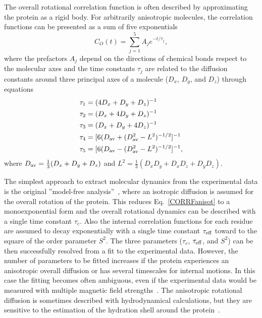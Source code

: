 \documentclass[journal=jpcbfk,manuscript=article]{achemso}
\begin{document}
The overall rotational correlation function is often described
by approximating the protein as a rigid body.
For arbitrarily anisotropic molecules, the correlation functions
can  be presented as a sum of five exponentials~\cite{woessner62,korzhnev01}
\begin{equation}\label{CORRFanisot}
  C_O(t)=\sum_{j=1}^5 A_j e^{-t/\tau_j},
\end{equation}
where the prefactors $A_j$ depend on the directions of chemical bonds 
respect to the molecular axes \cite{woessner62,luginbuhl97} and
the time constants $\tau_j$ are related 
to the diffusion constants around
three principal axes of a molecule
($D_{x}$, $D_{y}$, and $D_{z}$) through equations~\cite{woessner62,korzhnev01}
\begin{equation}\label{tauDIFFeq}
  \begin{split}
  \tau_1&=(4D_{x}+D_{y}+D_{z})^{-1} \\
  \tau_2&=(D_{x}+4D_{y}+D_{z})^{-1} \\
  \tau_3&=(D_{x}+D_{y}+4D_{z})^{-1} \\
  \tau_4&=[6(D_{\rm av}+(D_{\rm av}^2-L^2)^{-1/2}]^{-1} \\
  \tau_5&=[6(D_{\rm av}-(D_{\rm av}^2-L^2)^{-1/2}]^{-1}, \\
  \end{split}
\end{equation}
where $D_{\rm av}=\frac{1}{3}(D_{x}+D_{y}+D_{z})$ and 
$L^2=\frac{1}{3}(D_{x}D_{y}+D_{x}D_{z}+D_{y}D_{z})$.

The simplest approach to extract molecular dynamics from the experimental
data is the original ''model-free analysis''~\cite{Lipari82},
where an isotropic diffusion is assumed for the overall rotation of the protein.
This reduces Eq.~\ref{CORRFanisot} to a monoexponential form and the overall rotational
dynamics can be described with a single time constant $\tau_c$.
Also the internal correlation functions for each residue are assumed
to decay exponentially with a single time constant $\tau_{\rm eff}$
toward to the square of the order parameter $S^2$. The three parameters
($\tau_c$, $\tau_{\rm eff}$, and $S^2$) can be then successfully resolved from a
fit to the experimental data.
However, the number of parameters to be fitted increases if the protein
experiences an anisotropic overall diffusion or has several timescales for internal motions.
In this case the fitting becomes often ambiguous, even if the experimental data
would be measured with multiple magnetic field strengths~\cite{dosset00,luginbuhl97,jarymowycz06}.
The anisotropic rotational diffusion is sometimes described with hydrodynamical
calculations, but they are sensitive to the estimation of the
hydration shell around the protein~\cite{torre00}.
\end{document}
